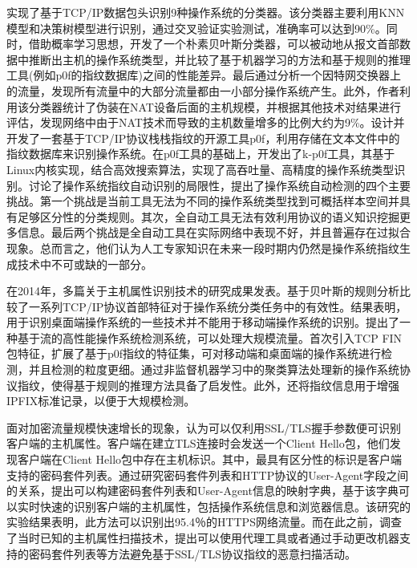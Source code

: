 \citet{lippmann2003passive}实现了基于TCP/IP数据包头识别9种操作系统的分类器。该分类器主要利用KNN模型和决策树模型进行识别，通过交叉验证实验测试，准确率可以达到90\%。同时，\citet{beverly2004robust}借助概率学习思想，开发了一个朴素贝叶斯分类器，可以被动地从报文首部数据中推断出主机的操作系统类型，并比较了基于机器学习的方法和基于规则的推理工具(例如p0f的指纹数据库)之间的性能差异。最后通过分析一个因特网交换器上的流量，发现所有流量中的大部分流量都由一小部分操作系统产生。此外，作者利用该分类器统计了伪装在NAT设备后面的主机规模，并根据其他技术对结果进行评估，发现网络中由于NAT技术而导致的主机数量增多的比例大约为9\%。\citet{zalewski2006p0f}设计并开发了一套基于TCP/IP协议栈栈指纹的开源工具p0f，利用存储在文本文件中的指纹数据库来识别操作系统。\citet{barnes2013k}在p0f工具的基础上，开发出了k-p0f工具，其基于Linux内核实现，结合高效搜索算法，实现了高吞吐量、高精度的操作系统类型识别。\citet{richardson2010limits}讨论了操作系统指纹自动识别的局限性，提出了操作系统自动检测的四个主要挑战。第一个挑战是当前工具无法为不同的操作系统类型找到可概括样本空间并具有足够区分性的分类规则。其次，全自动工具无法有效利用协议的语义知识挖掘更多信息。最后两个挑战是全自动工具在实际网络中表现不好，并且普遍存在过拟合现象。总而言之，他们认为人工专家知识在未来一段时期内仍然是操作系统指纹生成技术中不可或缺的一部分。

在2014年，多篇关于主机属性识别技术的研究成果发表。\citet{chen2014fingerprinting}基于贝叶斯的规则分析比较了一系列TCP/IP协议首部特征对于操作系统分类任务中的有效性。结果表明，用于识别桌面端操作系统的一些技术并不能用于移动端操作系统的识别。\citet{jirsik2014identifying}提出了一种基于流的高性能操作系统检测系统，可以处理大规模流量。\citet{al2014improving}首次引入TCP FIN包特征，扩展了基于p0f指纹的特征集，可对移动端和桌面端的操作系统进行检测，并且检测的粒度更细。\citet{matouvsek2014towards}通过非监督机器学习中的聚类算法处理新的操作系统协议指纹，使得基于规则的推理方法具备了启发性。此外，还将指纹信息用于增强IPFIX标准记录，以便于大规模检测。

面对加密流量规模快速增长的现象，\citet{husak2016https}认为可以仅利用SSL/TLS握手参数便可识别客户端的主机属性。客户端在建立TLS连接时会发送一个Client Hello包，他们发现客户端在Client Hello包中存在主机标识。其中，最具有区分性的标识是客户端支持的密码套件列表。通过研究密码套件列表和HTTP协议的User-Agent字段之间的关系，提出可以构建密码套件列表和User-Agent信息的映射字典，基于该字典可以实时快速的识别客户端的主机属性，包括操作系统信息和浏览器信息。该研究的实验结果表明，此方法可以识别出95.4％的HTTPS网络流量。而在此之前，\citet{bujlow2015web}调查了当时已知的主机属性扫描技术，提出可以使用代理工具或者通过手动更改机器支持的密码套件列表等方法避免基于SSL/TLS协议指纹的恶意扫描活动。

